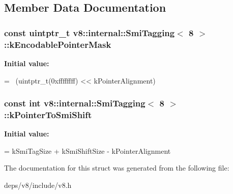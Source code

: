 \subsection{Member Data Documentation}
\hypertarget{structv8_1_1internal_1_1_smi_tagging_3_018_01_4_aa0a28e73d99764f7594b551d19aea5c0}{}
\subsubsection[{k\+Encodable\+Pointer\+Mask}]{\setlength{\rightskip}{0pt plus 5cm}const uintptr\+\_\+t {\bf v8\+::internal\+::\+Smi\+Tagging}$<$ 8 $>$\+::k\+Encodable\+Pointer\+Mask\hspace{0.3cm}{\ttfamily [static]}}\label{structv8_1_1internal_1_1_smi_tagging_3_018_01_4_aa0a28e73d99764f7594b551d19aea5c0}
{\bfseries Initial value\+:}
\begin{DoxyCode}
=
      ~(uintptr\_t(0xffffffff) << kPointerAlignment)
\end{DoxyCode}
\hypertarget{structv8_1_1internal_1_1_smi_tagging_3_018_01_4_adc8e3201cd2bc34b2119251edacb0c8a}{}
\subsubsection[{k\+Pointer\+To\+Smi\+Shift}]{\setlength{\rightskip}{0pt plus 5cm}const int {\bf v8\+::internal\+::\+Smi\+Tagging}$<$ 8 $>$\+::k\+Pointer\+To\+Smi\+Shift\hspace{0.3cm}{\ttfamily [static]}}\label{structv8_1_1internal_1_1_smi_tagging_3_018_01_4_adc8e3201cd2bc34b2119251edacb0c8a}
{\bfseries Initial value\+:}
\begin{DoxyCode}
=
      kSmiTagSize + kSmiShiftSize - kPointerAlignment
\end{DoxyCode}


The documentation for this struct was generated from the following file\+:\begin{DoxyCompactItemize}
\item 
deps/v8/include/v8.\+h\end{DoxyCompactItemize}
